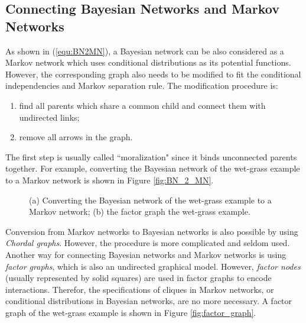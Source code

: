 \subsection{Connecting Bayesian Networks and Markov Networks}
As shown in (\ref{equ:BN2MN}), a Bayesian network can be also considered as a Markov network which uses conditional distributions 
as its potential functions. However, the corresponding graph also needs to be modified to fit the conditional independencies and Markov separation 
rule. The modification procedure is:        
\begin{enumerate}
	\item find all parents which share a common child and connect them with undirected links;   
	\item remove all arrows in the graph.     
\end{enumerate}
The first step is usually called ``moralization" since it binds unconnected parents together. For example, converting the Bayesian network of 
the wet-grass example to a Markov network is shown in Figure \ref{fig:BN_2_MN}.    
\begin{figure}
	\quad \quad \quad
	\caption{(a) Converting the Bayesian network of 
	the wet-grass example to a Markov network; (b) the factor graph the wet-grass example. }
\end{figure}

Conversion from Markov networks to Bayesian networks is also possible by using \emph{Chordal graphs}. However, the procedure is more complicated 
and seldom used.  Another way for connecting Bayesian networks and Markov networks is using \emph{factor graphs}, which is also an undirected graphical model. 
However, \emph{factor nodes} (usually represented by solid squares) are used in factor graphs to encode interactions. Therefor, the specifications of cliques  
in Markov networks, or conditional distributions in Bayesian networks, are no more necessary. A factor graph of the wet-grass example is shown in Figure \ref{fig:factor_graph}.      



